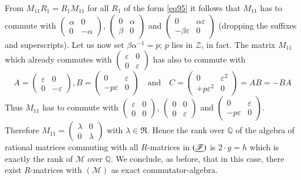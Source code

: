 From $M_{11}R_{1}=R_{1}M_{11}$ for all $R_{1}$ of the form \eqref{eq95}
it follows that $M_{11}$ has to commute with
$\left(\begin{smallmatrix} \alpha & 0\\ 0 & -\alpha
\end{smallmatrix}\right)$, $\left(\begin{smallmatrix} 0 &
  \alpha\\ \beta & 0\end{smallmatrix}\right)$ and
  $\left(\begin{smallmatrix} 0 & \alpha\varepsilon\\ -\beta\varepsilon & 0
  \end{smallmatrix}\right)$ (dropping the suffixes and
  superscripts). Let us now set $\beta\alpha^{-1}=p$; $p$ lies in
  $\mathscr{Z}$, in fact. The matrix $M_{11}$ which already commutes
  with $\left(\begin{smallmatrix} \varepsilon & 0\\ 0 & \varepsilon
  \end{smallmatrix}\right)$ has also to commute with 
\begin{equation*}
A=
\begin{pmatrix}
\varepsilon & 0\\
0 & -\varepsilon
\end{pmatrix},
B=
\begin{pmatrix}
0 & \varepsilon\\
-p\varepsilon & 0
\end{pmatrix}
\quad\text{and}\quad
C=
\begin{pmatrix}
0 & \varepsilon^{2}\\
+p\varepsilon^{2} & 0
\end{pmatrix}
=AB=-BA\tag{97}\label{eq97}
\end{equation*}\pageoriginale
Thus $M_{11}$ has to commute with $\left(\begin{smallmatrix}\varepsilon &
  0\\ 0 & 0\end{smallmatrix}\right)$, $\left(\begin{smallmatrix} 0 &
    0\\
0 & \varepsilon  \end{smallmatrix}\right)$ and $\left(\begin{smallmatrix}
0 & \varepsilon\\ -p\varepsilon & 0  \end{smallmatrix}\right)$. Therefore
  $M_{11}=\left(\begin{smallmatrix}\lambda & 0\\ 0 & \lambda
  \end{smallmatrix}\right)$ with $\lambda\in \mathfrak{R}$. Hence the
  rank over $\mathbb{Q}$ of the algebra of rational matrices commuting
  with all $R$-matrices in $(\underline{\mathscr{F}})$ is $2\cdot g=h$ which
  is exactly the rank of $\mathscr{M}$ over $\mathbb{Q}$. We conclude,
  as before, that in this case, there exist $R$-matrices with
  $(\mathscr{M})$ as exact commutator-algebra.

